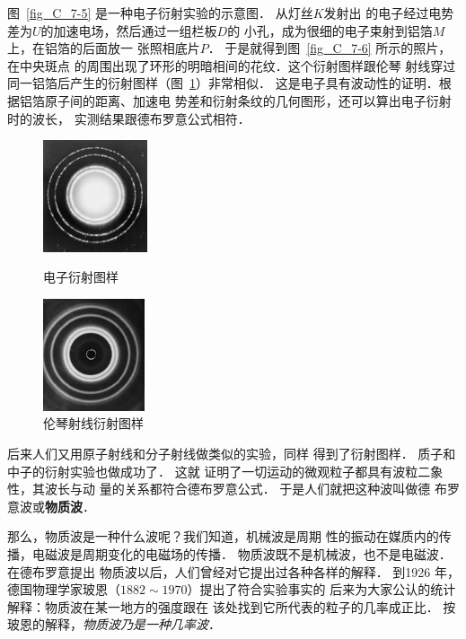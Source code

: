 图~\ref{fig_C_7-5} 是一种电子衍射实验的示意图．
从灯丝$K$发射出
的电子经过电势差为$U$的加速电场，然后通过一组栏板$D$的
小孔，成为很细的电子束射到铝箔$M$上，在铝箔的后面放一
张照相底片$P$．
于是就得到图~\ref{fig_C_7-6} 所示的照片，在中央斑点
的周围出现了环形的明暗相间的花纹．这个衍射图样跟伦琴
射线穿过同一铝箔后产生的衍射图样（图~\ref{fig_C_7-7}）非常相似．
这是电子具有波动性的证明．根据铝箔原子间的距离、加速电
势差和衍射条纹的几何图形，还可以算出电子衍射时的波长，
实测结果跟德布罗意公式相符．
\begin{figure}[htbp]
    \centering
    \begin{minipage}[t]{0.48\textwidth}
        \centering
        \includegraphics[height=3.3cm]{fig/C/7-6.jpg}
        \caption{电子衍射图样}\label{fig_C_7-6}
    \end{minipage}
    \begin{minipage}[t]{0.48\textwidth}
        \centering
        \includegraphics[height=3.3cm]{fig/C/7-7.jpg}
        \caption{伦琴射线衍射图样}\label{fig_C_7-7}
    \end{minipage}
\end{figure}


后来人们又用原子射线和分子射线做类似的实验，同样
得到了衍射图样．
质子和中子的衍射实验也做成功了．
这就
证明了一切运动的微观粒子都具有波粒二象性，其波长与动
量的关系都符合德布罗意公式．
于是人们就把这种波叫做德
布罗意波或\textbf{物质波}．

那么，物质波是一种什么波呢？我们知道，机械波是周期
性的振动在媒质内的传播，电磁波是周期变化的电磁场的传播．
物质波既不是机械波，也不是电磁波．
在德布罗意提出
物质波以后，人们曾经对它提出过各种各样的解释．
到1926
年，德国物理学家玻恩（$1882 \sim 1970$）提出了符合实验事实的
后来为大家公认的统计解释：物质波在某一地方的强度跟在
该处找到它所代表的粒子的几率成正比．
按玻恩的解释，\textit{物质波乃是一种几率波}．


